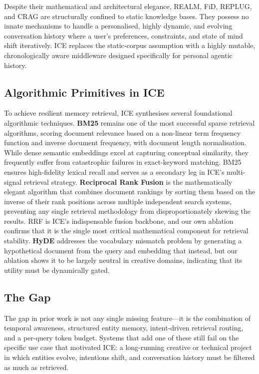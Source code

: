 \documentclass[10pt]{article}
\begin{document}
Despite their mathematical and architectural elegance, REALM, FiD, REPLUG, and CRAG are structurally confined to static knowledge bases. They possess no innate mechanisms to handle a personalised, highly dynamic, and evolving conversation history where a user's preferences, constraints, and state of mind shift iteratively. ICE replaces the static-corpus assumption with a highly mutable, chronologically aware middleware designed specifically for personal agentic history.

\subsection{Algorithmic Primitives in ICE}

To achieve resilient memory retrieval, ICE synthesises several foundational algorithmic techniques. \textbf{BM25} \citep{robertson2009bm25} remains one of the most successful sparse retrieval algorithms, scoring document relevance based on a non-linear term frequency function and inverse document frequency, with document length normalisation. While dense semantic embeddings excel at capturing conceptual similarity, they frequently suffer from catastrophic failures in exact-keyword matching. BM25 ensures high-fidelity lexical recall and serves as a secondary leg in ICE's multi-signal retrieval strategy. \textbf{Reciprocal Rank Fusion} \citep{cormack2009rrf} is the mathematically elegant algorithm that combines document rankings by sorting them based on the inverse of their rank positions across multiple independent search systems, preventing any single retrieval methodology from disproportionately skewing the results. RRF is ICE's indispensable fusion backbone, and our own ablation confirms that it is the single most critical mathematical component for retrieval stability. \textbf{HyDE} \citep{gao2023hyde} addresses the vocabulary mismatch problem by generating a hypothetical document from the query and embedding that instead, but our ablation shows it to be largely neutral in creative domains, indicating that its utility must be dynamically gated.

\subsection{The Gap}

The gap in prior work is not any single missing feature---it is the combination of temporal awareness, structured entity memory, intent-driven retrieval routing, and a per-query token budget. Systems that add one of these still fail on the specific use case that motivated ICE: a long-running creative or technical project in which entities evolve, intentions shift, and conversation history must be filtered as much as retrieved.
\end{document}
